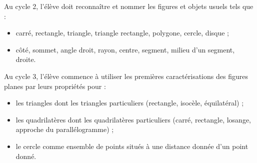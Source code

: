 {\renewcommand{\StringDOCUMENTATION}{Les figures à connaître}
\begin{documentation}
Au cycle 2, l'élève doit reconnaître et nommer les figures et objets usuels tels que :
\begin{itemize}
   \item carré, rectangle, triangle, triangle rectangle, polygone, cercle, disque ;
   \item côté, sommet, angle droit, rayon, centre, segment, milieu d’un segment, droite.
\end{itemize}
Au cycle 3, l'élève commence à utiliser les premières caractérisations des figures planes par leurs propriétés pour :
\begin{itemize}
   \item les triangles dont les triangles particuliers (rectangle, isocèle, équilatéral) ;
   \item les quadrilatères dont les quadrilatères particuliers (carré, rectangle, losange, approche du parallélogramme) ;
   \item le cercle comme ensemble de points situés à une distance donnée d'un point donné.
\end{itemize}
\end{documentation}}

\bigskip

